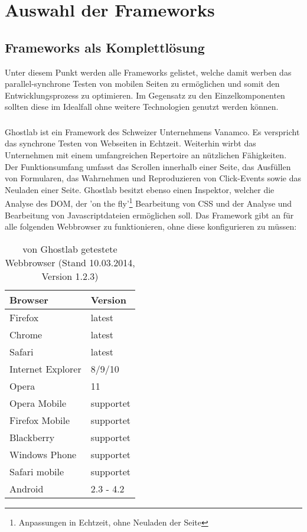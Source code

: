 \chapter{Auswahl der \Gls{Framework}s}

\section{Frameworks als Komplettlösung}
Unter diesem Punkt werden alle \Gls{Framework}s gelistet, welche damit werben das \gls{parallel-synchron}e Testen von mobilen Seiten zu ermöglichen und somit den Entwicklungsprozess zu optimieren. Im Gegensatz zu den Einzelkomponenten sollten diese im Idealfall ohne weitere Technologien genutzt werden können.
	
	\subsection{}
	Ghostlab ist ein \Gls{Framework} des Schweizer Unternehmens Vanamco. Es verspricht das synchrone Testen von Webseiten in Echtzeit. Weiterhin wirbt das Unternehmen mit einem umfangreichen Repertoire an nützlichen Fähigkeiten. Der Funktionsumfang umfasst das Scrollen innerhalb einer Seite, das Ausfüllen von  Formularen, das Wahrnehmen und Reproduzieren von Click-Events sowie das Neuladen einer Seite. Ghostlab besitzt ebenso einen Inspektor, welcher die Analyse des \Gls{DOM}, der 'on the fly'\footnote{Anpassungen in Echtzeit, ohne Neuladen der Seite} Bearbeitung von CSS und der Analyse und Bearbeitung von \Gls{Javascript}dateien ermöglichen soll. Das \Gls{Framework} gibt an für alle folgenden \Gls{Webbrowser} zu funktionieren, ohne diese konfigurieren zu müssen:

	\begin{table}[H]
 		\centering
			\begin{tabular}{| p{5cm} | p{5cm} |}
			
			\hline
				Browser 	& 	Version\\
			\hline
			\hline
				Firefox	&	latest\\
				Chrome	&	latest\\
				Safari	&	latest\\
				Internet Explorer	&	8/9/10\\
				Opera	&	11\\
				Opera Mobile	&	supportet\\
				Firefox Mobile	&	supportet\\
				Blackberry	&	supportet\\
				Windows Phone	&	supportet\\
				Safari mobile	&	supportet\\	
				Android	&	2.3 - 4.2\\
				\hline
				\end{tabular}
			\caption{von Ghostlab getestete \Gls{Webbrowser} (Stand 10.03.2014, Version 1.2.3)}
	\end{table}

